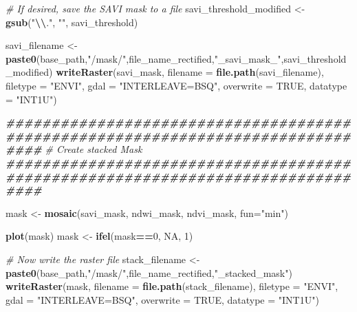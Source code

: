 \documentclass[
]{article}
\newenvironment{Shaded}{\begin{snugshade}}{\end{snugshade}}
\newcommand{\AttributeTok}[1]{\textcolor[rgb]{0.13,0.29,0.53}{#1}}
\newcommand{\CommentTok}[1]{\textcolor[rgb]{0.56,0.35,0.01}{\textit{#1}}}
\newcommand{\ConstantTok}[1]{\textcolor[rgb]{0.56,0.35,0.01}{#1}}
\newcommand{\DecValTok}[1]{\textcolor[rgb]{0.00,0.00,0.81}{#1}}
\newcommand{\DocumentationTok}[1]{\textcolor[rgb]{0.56,0.35,0.01}{\textbf{\textit{#1}}}}
\newcommand{\FunctionTok}[1]{\textcolor[rgb]{0.13,0.29,0.53}{\textbf{#1}}}
\newcommand{\NormalTok}[1]{#1}
\newcommand{\OtherTok}[1]{\textcolor[rgb]{0.56,0.35,0.01}{#1}}
\newcommand{\SpecialCharTok}[1]{\textcolor[rgb]{0.81,0.36,0.00}{\textbf{#1}}}
\newcommand{\StringTok}[1]{\textcolor[rgb]{0.31,0.60,0.02}{#1}}
\begin{document}
\begin{Shaded}
\begin{Highlighting}[]
\CommentTok{\# If desired, save the SAVI mask to a file}
\NormalTok{savi\_threshold\_modified }\OtherTok{\textless{}{-}} \FunctionTok{gsub}\NormalTok{(}\StringTok{"}\SpecialCharTok{\textbackslash{}\textbackslash{}}\StringTok{."}\NormalTok{, }\StringTok{""}\NormalTok{, savi\_threshold)}

\NormalTok{savi\_filename }\OtherTok{\textless{}{-}} \FunctionTok{paste0}\NormalTok{(base\_path,}\StringTok{"/mask/"}\NormalTok{,file\_name\_rectified,}\StringTok{"\_savi\_mask\_"}\NormalTok{,savi\_threshold\_modified)}
\FunctionTok{writeRaster}\NormalTok{(savi\_mask, }\AttributeTok{filename =} \FunctionTok{file.path}\NormalTok{(savi\_filename),}
            \AttributeTok{filetype =} \StringTok{"ENVI"}\NormalTok{,}
            \AttributeTok{gdal =} \StringTok{"INTERLEAVE=BSQ"}\NormalTok{,}
            \AttributeTok{overwrite =} \ConstantTok{TRUE}\NormalTok{,}
            \AttributeTok{datatype =} \StringTok{"INT1U"}\NormalTok{)}

\DocumentationTok{\#\#\#\#\#\#\#\#\#\#\#\#\#\#\#\#\#\#\#\#\#\#\#\#\#\#\#\#\#\#\#\#\#\#\#\#\#\#\#\#\#\#\#\#\#\#\#\#\#\#\#\#\#\#\#\#\#\#\#\#\#\#\#\#\#\#\#\#\#\#\#\#\#\#\#\#\#\#\#\#}
\CommentTok{\# Create stacked Mask}
\DocumentationTok{\#\#\#\#\#\#\#\#\#\#\#\#\#\#\#\#\#\#\#\#\#\#\#\#\#\#\#\#\#\#\#\#\#\#\#\#\#\#\#\#\#\#\#\#\#\#\#\#\#\#\#\#\#\#\#\#\#\#\#\#\#\#\#\#\#\#\#\#\#\#\#\#\#\#\#\#\#\#\#\#}

\NormalTok{mask }\OtherTok{\textless{}{-}} \FunctionTok{mosaic}\NormalTok{(savi\_mask, ndwi\_mask, ndvi\_mask, }\AttributeTok{fun=}\StringTok{"min"}\NormalTok{)}

\FunctionTok{plot}\NormalTok{(mask)}
\NormalTok{mask }\OtherTok{\textless{}{-}} \FunctionTok{ifel}\NormalTok{(mask}\SpecialCharTok{==}\DecValTok{0}\NormalTok{, }\ConstantTok{NA}\NormalTok{, }\DecValTok{1}\NormalTok{)}

\CommentTok{\# Now write the raster file}
\NormalTok{stack\_filename }\OtherTok{\textless{}{-}} \FunctionTok{paste0}\NormalTok{(base\_path,}\StringTok{"/mask/"}\NormalTok{,file\_name\_rectified,}\StringTok{"\_stacked\_mask"}\NormalTok{)}
\FunctionTok{writeRaster}\NormalTok{(mask, }\AttributeTok{filename =} \FunctionTok{file.path}\NormalTok{(stack\_filename),}
            \AttributeTok{filetype =} \StringTok{"ENVI"}\NormalTok{,}
            \AttributeTok{gdal =} \StringTok{"INTERLEAVE=BSQ"}\NormalTok{,}
            \AttributeTok{overwrite =} \ConstantTok{TRUE}\NormalTok{,}
            \AttributeTok{datatype =} \StringTok{"INT1U"}\NormalTok{)}
\end{Highlighting}
\end{Shaded}
\end{document}
